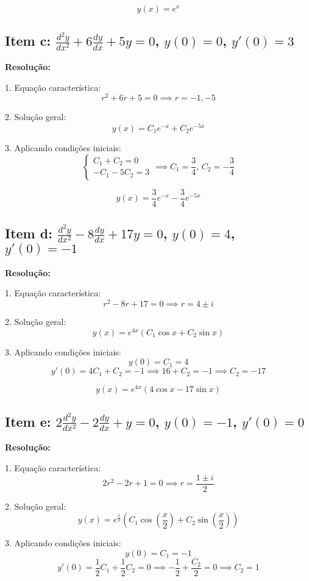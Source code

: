 \documentclass[12pt,a4paper]{article}
\begin{document}
\[
\boxed{y(x) = e^{x}}
\]

\subsection*{Item c: \(\frac{d^2 y}{dx^2} + 6\frac{dy}{dx} + 5y = 0\), \(y(0) = 0\), \(y'(0) = 3\)}

\textbf{Resolução:}

1. Equação característica:
\[
r^2 + 6r + 5 = 0 \implies r = -1, -5
\]

2. Solução geral:
\[
y(x) = C_1 e^{-x} + C_2 e^{-5x}
\]

3. Aplicando condições iniciais:
\[
\begin{cases}
C_1 + C_2 = 0 \\
-C_1 -5C_2 = 3
\end{cases} \implies C_1 = \frac{3}{4}, \, C_2 = -\frac{3}{4}
\]

\[
\boxed{y(x) = \frac{3}{4}e^{-x} - \frac{3}{4}e^{-5x}}
\]

\subsection*{Item d: \(\frac{d^2 y}{dx^2} - 8\frac{dy}{dx} + 17y = 0\), \(y(0) = 4\), \(y'(0) = -1\)}

\textbf{Resolução:}

1. Equação característica:
\[
r^2 - 8r + 17 = 0 \implies r = 4 \pm i
\]

2. Solução geral:
\[
y(x) = e^{4x}\left(C_1 \cos x + C_2 \sin x\right)
\]

3. Aplicando condições iniciais:
\[
y(0) = C_1 = 4
\]
\[
y'(0) = 4C_1 + C_2 = -1 \implies 16 + C_2 = -1 \implies C_2 = -17
\]

\[
\boxed{y(x) = e^{4x}\left(4\cos x - 17\sin x\right)}
\]

\subsection*{Item e: \(2\frac{d^2 y}{dx^2} - 2\frac{dy}{dx} + y = 0\), \(y(0) = -1\), \(y'(0) = 0\)}

\textbf{Resolução:}

1. Equação característica:
\[
2r^2 - 2r + 1 = 0 \implies r = \frac{1 \pm i}{2}
\]

2. Solução geral:
\[
y(x) = e^{\frac{x}{2}}\left(C_1 \cos\left(\frac{x}{2}\right) + C_2 \sin\left(\frac{x}{2}\right)\right)
\]

3. Aplicando condições iniciais:
\[
y(0) = C_1 = -1
\]
\[
y'(0) = \frac{1}{2}C_1 + \frac{1}{2}C_2 = 0 \implies -\frac{1}{2} + \frac{C_2}{2} = 0 \implies C_2 = 1
\]
\end{document}
